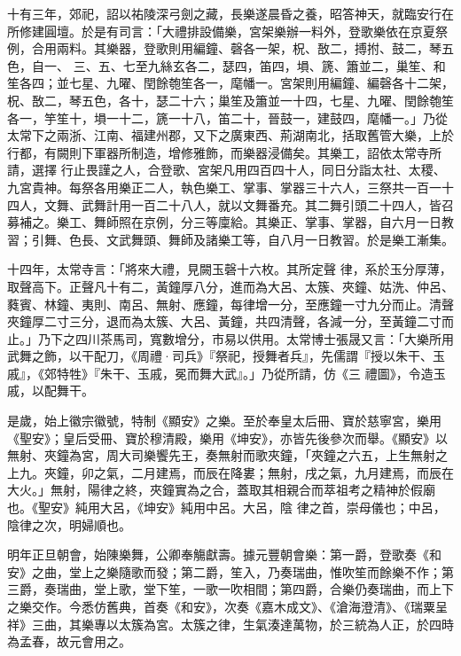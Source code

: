 \begin{pinyinscope}
 十有三年，郊祀，詔以祐陵深弓劍之藏，長樂遂晨昏之養，昭答神天，就臨安行在所修建圓壇。於是有司言：「大禮排設備樂，宮架樂辦一料外，登歌樂依在京夏祭例，合用兩料。其樂器，登歌則用編鐘、磬各一架，柷、敔二，搏拊、鼓二，琴五色，自一、
 三、五、七至九絲玄各二，瑟四，笛四，塤、篪、簫並二，巢笙、和笙各四；並七星、九曜、閏餘匏笙各一，麾幡一。宮架則用編鐘、編磬各十二架，柷、敔二，琴五色，各十，瑟二十六；巢笙及簫並一十四，七星、九曜、閏餘匏笙各一，竽笙十，塤一十二，篪一十八，笛二十，晉鼓一，建鼓四，麾幡一。」乃從太常下之兩浙、江南、福建州郡，又下之廣東西、荊湖南北，括取舊管大樂，上於行都，有闕則下軍器所制造，增修雅飾，而樂器浸備矣。其樂工，詔依太常寺所請，選擇
 行止畏謹之人，合登歌、宮架凡用四百四十人，同日分詣太社、太稷、九宮貴神。每祭各用樂正二人，執色樂工、掌事、掌器三十六人，三祭共一百一十四人，文舞、武舞計用一百二十八人，就以文舞番充。其二舞引頭二十四人，皆召募補之。樂工、舞師照在京例，分三等廩給。其樂正、掌事、掌器，自六月一日教習；引舞、色長、文武舞頭、舞師及諸樂工等，自八月一日教習。於是樂工漸集。



 十四年，太常寺言：「將來大禮，見闕玉磬十六枚。其所定聲
 律，系於玉分厚薄，取聲高下。正聲凡十有二，黃鐘厚八分，進而為大呂、太簇、夾鐘、姑洗、仲呂、蕤賓、林鐘、夷則、南呂、無射、應鐘，每律增一分，至應鐘一寸九分而止。清聲夾鐘厚二寸三分，退而為太簇、大呂、黃鐘，共四清聲，各減一分，至黃鐘二寸而止。」乃下之四川茶馬司，寬數增分，市易以供用。太常博士張晟又言：「大樂所用武舞之飾，以干配刀，《周禮·司兵》『祭祀，授舞者兵』，先儒謂『授以朱干、玉戚』，《郊特牲》『朱干、玉戚，冕而舞大武』。」乃從所請，仿《三
 禮圖》，令造玉戚，以配舞干。



 是歲，始上徽宗徽號，特制《顯安》之樂。至於奉皇太后冊、寶於慈寧宮，樂用《聖安》；皇后受冊、寶於穆清殿，樂用《坤安》，亦皆先後參次而舉。《顯安》以無射、夾鐘為宮，周大司樂饗先王，奏無射而歌夾鐘，「夾鐘之六五，上生無射之上九。夾鐘，卯之氣，二月建焉，而辰在降婁；無射，戌之氣，九月建焉，而辰在大火。」無射，陽律之終，夾鐘實為之合，蓋取其相親合而萃祖考之精神於假廟也。《聖安》純用大呂，《坤安》純用中呂。大呂，陰
 律之首，崇母儀也；中呂，陰律之次，明婦順也。



 明年正旦朝會，始陳樂舞，公卿奉觴獻壽。據元豐朝會樂：第一爵，登歌奏《和安》之曲，堂上之樂隨歌而發；第二爵，笙入，乃奏瑞曲，惟吹笙而餘樂不作；第三爵，奏瑞曲，堂上歌，堂下笙，一歌一吹相間；第四爵，合樂仍奏瑞曲，而上下之樂交作。今悉仿舊典，首奏《和安》，次奏《嘉木成文》、《滄海澄清》、《瑞粟呈祥》三曲，其樂專以太簇為宮。太簇之律，生氣湊達萬物，於三統為人正，於四時為孟春，故元會用之。




\end{pinyinscope}

